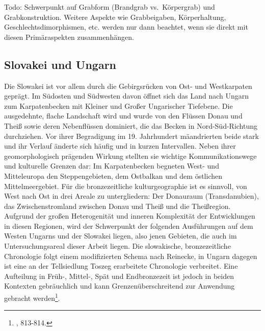 \documentclass[openany,twoside,twocolumn]{book}
\let\rmarkdownfootnote\footnote%
\def\footnote{\protect\rmarkdownfootnote}
\begin{document}
Todo: Schwerpunkt auf Grabform (Brandgrab vs.~Körpergrab) und
Grabkonstruktion. Weitere Aspekte wie Grabbeigaben, Körperhaltung,
Geschlechtsdimorphismen, etc. werden nur dann beachtet, wenn sie direkt
mit diesen Primäraspekten zusammenhängen.

\hypertarget{slovakei-und-ungarn}{%
\subsection{Slovakei und Ungarn}\label{slovakei-und-ungarn}}

Die Slowakei ist vor allem durch die Gebirgsrücken von Ost- und
Westkarpaten geprägt. Im Südosten und Südwesten davon öffnet sich das
Land nach Ungarn zum Karpatenbecken mit Kleiner und Großer Ungarischer
Tiefebene. Die ausgedehnte, flache Landschaft wird und wurde von den
Flüssen Donau und Theiß sowie deren Nebenflüssen dominiert, die das
Becken in Nord-Süd-Richtung durchziehen. Vor ihrer Begradigung im 19.
Jahrhundert mäandrierten beide stark und ihr Verlauf änderte sich häufig
und in kurzen Intervallen. Neben ihrer geomorphologisch prägenden
Wirkung stellten sie wichtige Kommunikationswege und kulturelle Grenzen
dar: Im Karpatenbecken begneten West- und Mitteleuropa den
Steppengebieten, dem Ostbalkan und dem östlichen Mittelmeergebiet. Für
die bronzezeitliche kulturgeographie ist es sinnvoll, von West nach Ost
in drei Areale zu untergliedern: Der Donauraum (Transdanubien), das
Zwischenstromland zwischen Donau und Theiß und die Theißregion. Aufgrund
der großen Heterogenität und inneren Komplexität der Entwicklungen in
diesen Regionen, wird der Schwerpunkt der folgenden Ausführungen auf dem
Westen Ungarns und der Slowakei liegen, also jenen Gebieten, die auch im
Untersuchungsareal dieser Arbeit liegen. Die slowakische,
bronzezeitliche Chronologie folgt einem modifizierten Schema nach
Reinecke, in Ungarn dagegen ist eine an der Tellsiedlung Toszeg
erarbeitete Chronologie verbreitet. Eine Aufteilung in Früh-, Mittel-,
Spät und Endbronzezeit ist jedoch in beiden Kontexten gebräuchlich und
kann Grenzenüberschreitend zur Anwendung gebracht werden\footnote{\textcite{markova_slovakia_2013},
  813-814.}.
\end{document}
